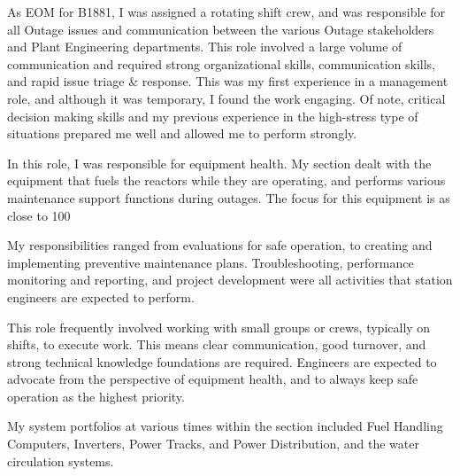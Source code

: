 \documentclass{my_cv}
\begin{document}
As EOM for B1881, I was assigned a rotating shift crew, and was responsible for all Outage issues and communication between the various Outage stakeholders and Plant Engineering departments. This role involved a large volume of communication and required strong organizational skills, communication skills, and rapid issue triage \& response. This was my first experience in a management role, and although it was temporary, I found the work engaging. Of note, critical decision making skills and my previous experience in the high-stress type of situations prepared me well and allowed me to perform strongly.


In this role, I was responsible for equipment health. My section dealt with the equipment that fuels the reactors while they are operating, and performs various maintenance support functions during outages. The focus for this equipment is as close to 100%

My responsibilities ranged from evaluations for safe operation, to creating and implementing preventive maintenance plans. Troubleshooting, performance monitoring and reporting, and project development were all activities that station engineers are expected to perform.

This role frequently involved working with small groups or crews, typically on shifts, to execute work. This means clear communication, good turnover, and strong technical knowledge foundations are required. Engineers are expected to advocate from the perspective of equipment health, and to always keep safe operation as the highest priority.

My system portfolios at various times within the section included Fuel Handling Computers, Inverters, Power Tracks, and Power Distribution, and the water circulation systems.
\end{document}
